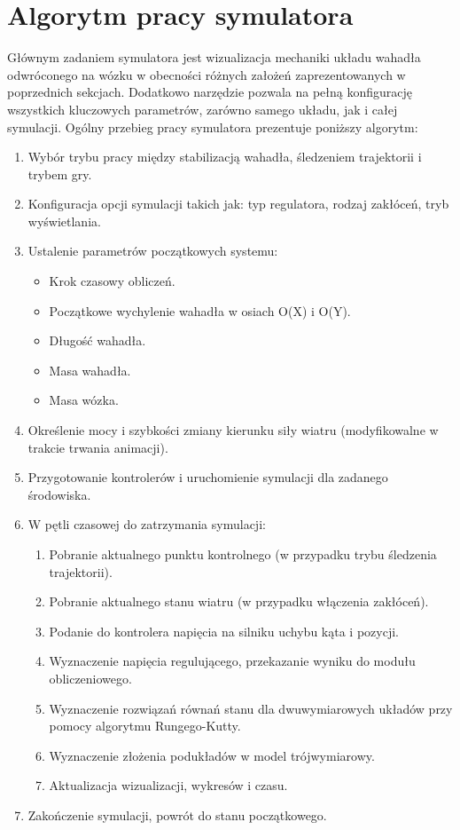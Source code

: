 \documentclass[12pt, twoside, openany]{report}
\theoremstyle{definition}
\begin{document}
\section{Algorytm pracy symulatora}
Głównym zadaniem symulatora jest wizualizacja mechaniki układu wahadła odwróconego na wózku w obecności różnych założeń zaprezentowanych w poprzednich sekcjach. Dodatkowo narzędzie pozwala na pełną konfigurację wszystkich kluczowych parametrów, zarówno samego układu, jak i całej symulacji. Ogólny przebieg pracy symulatora prezentuje poniższy algorytm:
\begin{enumerate}
\item Wybór trybu pracy między stabilizacją wahadła, śledzeniem trajektorii i trybem gry.
\item Konfiguracja opcji symulacji takich jak: typ regulatora, rodzaj zakłóceń, tryb wyświetlania.
\item Ustalenie parametrów początkowych systemu:
\begin{itemize}
\item Krok czasowy obliczeń.
\item Początkowe wychylenie wahadła w osiach O(X) i O(Y).
\item Długość wahadła.
\item Masa wahadła.
\item Masa wózka.
\end{itemize}
\item Określenie mocy i szybkości zmiany kierunku siły wiatru (modyfikowalne w trakcie trwania animacji).
\item Przygotowanie kontrolerów i uruchomienie symulacji dla zadanego środowiska.
\item W pętli czasowej do zatrzymania symulacji:
\begin{enumerate}
\item Pobranie aktualnego punktu kontrolnego (w przypadku trybu śledzenia trajektorii).
\item Pobranie aktualnego stanu wiatru (w przypadku włączenia zakłóceń).
\item Podanie do kontrolera napięcia na silniku uchybu kąta i pozycji.
\item Wyznaczenie napięcia regulującego, przekazanie wyniku do modułu obliczeniowego.
\item Wyznaczenie rozwiązań równań stanu dla dwuwymiarowych układów przy pomocy algorytmu Rungego-Kutty.
\item Wyznaczenie złożenia podukładów w model trójwymiarowy.
\item Aktualizacja wizualizacji, wykresów i czasu.
\end{enumerate}
\item Zakończenie symulacji, powrót do stanu początkowego.
\end{enumerate}
\end{document}
